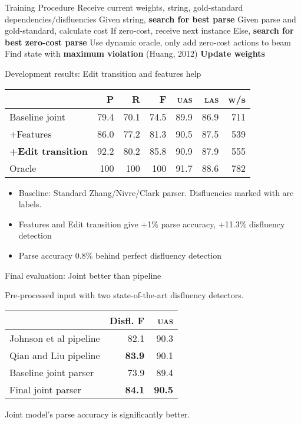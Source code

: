 \documentclass[color=usenames,dvipsnames]{lecture}
\begin{document}
\begin{points}{Training Procedure}
\p Receive current weights, string, gold-standard dependencies/disfluencies
\p Given string, \textbf{search for best parse}
\p Given parse and gold-standard, calculate cost
\p If zero-cost, receive next instance
\p Else, \textbf{search for best zero-cost parse}
\p Use dynamic oracle, only add zero-cost actions to beam
\p Find state with \textbf{maximum violation} (Huang, 2012)
\p \textbf{Update weights}
\end{points}

\begin{plain}{Development results: Edit transition and features help}

\begin{table}
    \centering
    \small
    \begin{tabular}{l|rrr|rr|r}
        & P & R & F & \textsc{uas} & \textsc{las} & w/s \\
        \hline \hline
        Baseline joint        &	79.4 &	70.1 &	74.5 &	89.9 &	86.9 & 711 \\
        +Features             &	86.0 &	77.2 &	81.3 &	90.5 &	87.5 & 539 \\ 
\textbf{+Edit transition}      &	92.2 &	80.2 &	85.8 &	90.9 &	87.9 & 555 \\ 
\hline       
Oracle   & 100 & 100 & 100 & 91.7    & 88.6 & 782 \\
\hline
    \end{tabular}
\end{table}
\begin{itemize}
\item Baseline: Standard Zhang/Nivre/Clark parser. Disfluencies marked with arc labels.
\item Features and Edit transition give +1\% parse accuracy, +11.3\% disfluency detection
\item Parse accuracy 0.8\% behind perfect disfluency detection
\end{itemize}
\end{plain}

\begin{plain}{Final evaluation: Joint better than pipeline}

Pre-processed input with two state-of-the-art disfluency detectors.

\begin{table}
    \small
    \centering
    \begin{tabular}{l|r|r}
        & Disfl. F & \textsc{uas} \\
        \hline \hline
        Johnson et al pipeline      & 82.1 & 90.3 \\ 
        Qian and Liu  pipeline      & \textbf{83.9} & 90.1 \\
\hline
Baseline joint parser & 73.9 & 89.4 \\
Final joint parser    & \textbf{84.1} & \textbf{90.5} \\
\hline
    \end{tabular}
\end{table}

Joint model's parse accuracy is significantly better.

\end{plain}
\end{document}
